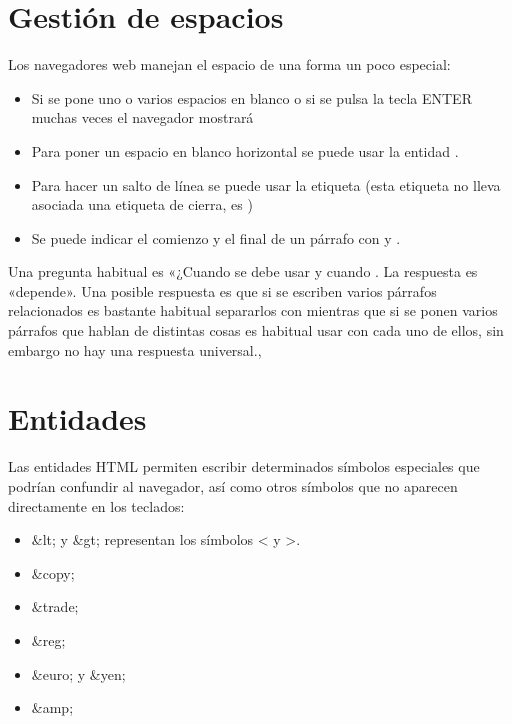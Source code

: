 \documentclass[letterpaper,10pt,spanish]{sphinxmanual}
\begin{document}
\section{Gestión de espacios}
\label{\detokenize{tema2:gestion-de-espacios}}
Los navegadores web manejan el espacio de una forma un poco especial:
\begin{itemize}
\item {} 
Si se pone uno o varios espacios en blanco o si se pulsa la tecla ENTER muchas veces el navegador mostrará 

\item {} 
Para poner un espacio en blanco horizontal se puede usar la entidad .

\item {} 
Para hacer un salto de línea se puede usar la etiqueta  (esta etiqueta no lleva asociada una etiqueta de cierra, es )

\item {} 
Se puede indicar el comienzo y el final de un párrafo con  y .

\end{itemize}

Una pregunta habitual es «¿Cuando se debe usar  y cuando . La respuesta es «depende». Una posible respuesta es que si se escriben varios párrafos relacionados es bastante habitual separarlos con  mientras que si se ponen varios párrafos que hablan de distintas cosas es habitual usar  con cada uno de ellos, sin embargo no hay una respuesta universal.,


\section{Entidades}
\label{\detokenize{tema2:entidades}}
Las entidades HTML permiten escribir determinados símbolos especiales que podrían confundir al navegador, así como otros símbolos que no aparecen directamente en los teclados:
\begin{itemize}
\item {} 
\&lt; y \&gt; representan los símbolos \textless{} y \textgreater{}.

\item {} 
\&copy;

\item {} 
\&trade;

\item {} 
\&reg;

\item {} 
\&euro; y \&yen;

\item {} 
\&amp;

\end{itemize}
\end{document}
